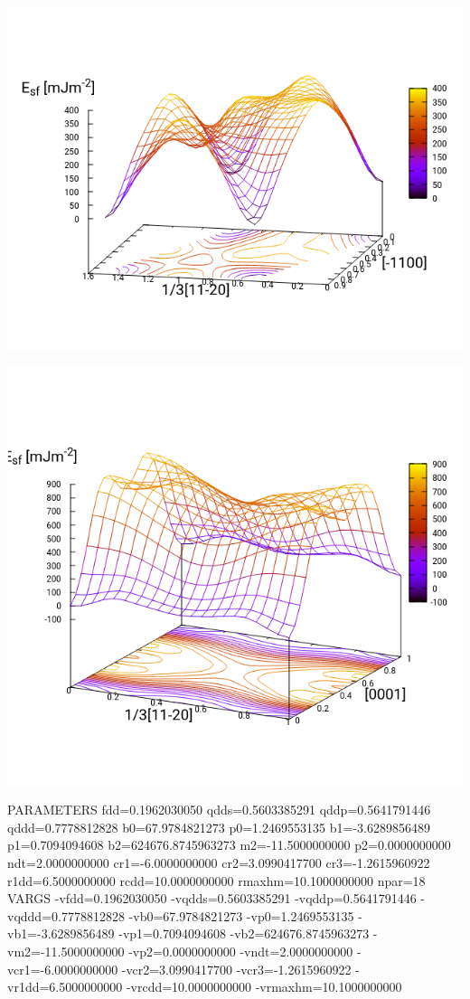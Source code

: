 \documentclass[11pt]{article}
\begin{document}
\begin{center}
\includegraphics[width=.9\linewidth]{Images/basal_gs_oo_2019-10-29.png}
\end{center}

\begin{center}
\includegraphics[width=.9\linewidth]{Images/prismatic_gs_oo_2019-10-29.png}
\end{center}





PARAMETERS
  fdd=0.1962030050 qdds=0.5603385291 qddp=0.5641791446 qddd=0.7778812828 b0=67.9784821273 p0=1.2469553135 b1=-3.6289856489 p1=0.7094094608 b2=624676.8745963273 m2=-11.5000000000 p2=0.0000000000 ndt=2.0000000000 cr1=-6.0000000000 cr2=3.0990417700 cr3=-1.2615960922 r1dd=6.5000000000 rcdd=10.0000000000 rmaxhm=10.1000000000 npar=18 
VARGS
    -vfdd=0.1962030050 -vqdds=0.5603385291 -vqddp=0.5641791446 -vqddd=0.7778812828 -vb0=67.9784821273 -vp0=1.2469553135 -vb1=-3.6289856489 -vp1=0.7094094608 -vb2=624676.8745963273 -vm2=-11.5000000000 -vp2=0.0000000000 -vndt=2.0000000000 -vcr1=-6.0000000000 -vcr2=3.0990417700 -vcr3=-1.2615960922 -vr1dd=6.5000000000 -vrcdd=10.0000000000 -vrmaxhm=10.1000000000 
\end{document}

